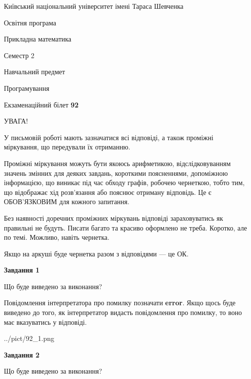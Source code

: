 \documentclass[12pt, ukrainian]{article}
\begin{document}
{{\begin {small}\par
{ \center  Київський національний університет імені Тараса Шевченка \par}
{\parbox {5 cm}{Освітня програма \hfill}{\parbox {7 cm}{Прикладна математика \hfill}}\parbox {6 cm}{\hfill Семестр 2}}\par
{\parbox {5 cm} {Навчальний предмет \hfill}\parbox {7 cm}{Програмування \hfill}\parbox {6cm}{\hfill}\par}\vspace{-7pt} \end{small}}{\center Екзаменаційний білет \No \textbf
{ 92 }\par}}
{
\begin {large}
УВАГА!

У письмовій роботі мають зазначатися всі відповіді, а також проміжні міркування, що передували їх отриманню.

Проміжні міркування можуть бути якоюсь арифметикою, відслідковуванням зна\-чень змінних для деяких завдань,
короткими поясненнями, допоміжною інформацією, що виникає під час обходу графів, робочею чернеткою,
тобто тим, що відображає хід розв’язання або пояснює отриману відповідь.
Це є ОБОВ’ЯЗКОВИМ для кожного запитання.

Без наявності доречних проміжних міркувань відповіді зараховуватись як правиль\-ні не будуть.
Писати багато та красиво оформлено не треба. Коротко, але по темі. Можли\-во, навіть чернетка.

Якщо на аркуші буде чернетка разом з відповідями --- це ОК.

\newpage

{\begin {center}\textbf{Завдання 1}\end {center}}\par
Що буде виведено за виконання?

Повідомлення інтерпретатора про помилку позначати \textbf{error}.
Якщо щось буде виведено до того, як інтерпретатор видасть повідомлення про помилку, 
то воно має вказуватись у відповіді. \par


\begin{center}
	{../pict/92_1.png}
\end{center}
\newpage

{\begin {center}\textbf{Завдання 2}\end {center}}\par
Що буде виведено за виконання?


\end{large}}
\end{document}
